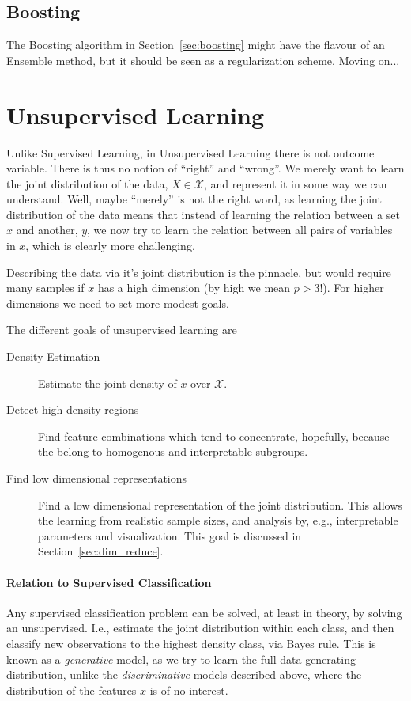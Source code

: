 \documentclass[12pt,a4paper]{article}
\theoremstyle{plain}
\theoremstyle{definition}
\newcommand{\featureS}{\mathcal{X}}
\begin{document}
\subsection{Boosting}
The Boosting algorithm in Section~\ref{sec:boosting} might have the flavour of an Ensemble method, but it should be seen as a regularization scheme. Moving on...







\section{Unsupervised Learning}
\label{sec:unsupervised}

Unlike Supervised Learning, in Unsupervised Learning there is not outcome variable. There is thus no notion of ``right'' and ``wrong''. 
We merely want to learn the joint distribution of the data, $X \in \featureS$, and represent it in some way we can understand. 
Well, maybe ``merely'' is not the right word, as learning the joint distribution of the data means that instead of learning the relation between a set $x$ and another, $y$, we now try to learn the relation between all pairs of variables in $x$, which is clearly more challenging. 

Describing the data via it's joint distribution is the pinnacle, but would require many samples if $x$ has a high dimension (by high we mean $p>3$!). For higher dimensions we need to set more modest goals.

The different goals of unsupervised learning are
\begin{description}
\item[Density Estimation] Estimate the joint density of $x$ over $\featureS$.
\item[Detect high density regions] Find feature combinations which tend to concentrate, hopefully, because the belong to homogenous and interpretable subgroups.
\item[Find low dimensional representations] Find a low dimensional representation of the joint distribution. This allows the learning from realistic sample sizes, and analysis by, e.g., interpretable parameters and visualization.
This goal is discussed in Section~\ref{sec:dim_reduce}.
\end{description}


\paragraph{Relation to Supervised Classification}
Any supervised classification problem can be solved, at least in theory, by solving an unsupervised. 
I.e., estimate the joint distribution within each class, and then classify new observations to the highest density class, via Bayes rule. 
This is known as a \emph{generative} model, as we try to learn the full data generating distribution, unlike the \emph{discriminative} models described above, where the distribution of the features $x$ is of no interest.
\end{document}

